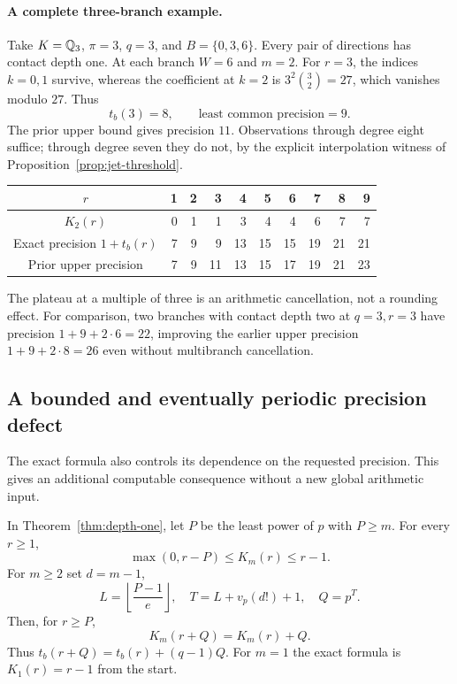 \paragraph{A complete three-branch example.}
Take $K=\mathbb Q_3$, $\pi=3$, $q=3$, and $B=\{0,3,6\}$. Every pair of directions has contact depth one. At each branch $W=6$ and $m=2$. For $r=3$, the indices $k=0,1$ survive, whereas the coefficient at $k=2$ is
$3^2\binom32=27$, which vanishes modulo $27$. Thus
\[
 t_b(3)=8,\qquad \text{least common precision}=9.
\]
The prior upper bound gives precision $11$. Observations through degree eight suffice; through degree seven they do not, by the explicit interpolation witness of Proposition~\ref{prop:jet-threshold}.

\begin{center}\small
\begin{tabular}{c|rrrrrrrrr}
\toprule
$r$ &1&2&3&4&5&6&7&8&9\\
\midrule
$K_2(r)$ &0&1&1&3&4&4&6&7&7\\
Exact precision $1+t_b(r)$ &7&9&9&13&15&15&19&21&21\\
Prior upper precision &7&9&11&13&15&17&19&21&23\\
\bottomrule
\end{tabular}
\end{center}

The plateau at a multiple of three is an arithmetic cancellation, not a rounding effect. For comparison, two branches with contact depth two at $q=3,r=3$ have precision
$1+9+2\cdot6=22$, improving the earlier upper precision $1+9+2\cdot8=26$ even without multibranch cancellation.

\subsection{A bounded and eventually periodic precision defect}

The exact formula also controls its dependence on the requested precision. This gives an additional computable consequence without a new global arithmetic input.

\begin{corollary}\label{cor:period}
In Theorem~\ref{thm:depth-one}, let $P$ be the least power of $p$ with $P\ge m$. For every $r\ge1$,
\[
 \max(0,r-P)\le K_m(r)\le r-1.
\]
For $m\ge2$ set $d=m-1$,
\[
 L=\left\lfloor\frac{P-1}{e}\right\rfloor,
 \quad T=L+v_p(d!)+1,\quad Q=p^T.
\]
Then, for $r\ge P$,
\[
 K_m(r+Q)=K_m(r)+Q.
\]
Thus $t_b(r+Q)=t_b(r)+(q-1)Q$. For $m=1$ the exact formula is $K_1(r)=r-1$ from the start.
\end{corollary}

